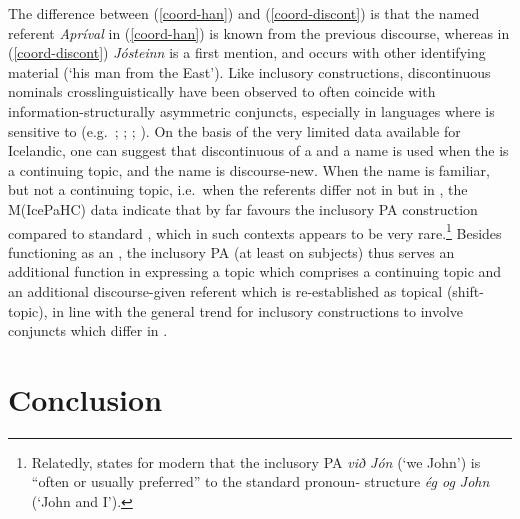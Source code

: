 \documentclass[output=paper,colorlinks,citecolor=brown]{langscibook}
\begin{document}
The difference between (\ref{coord-han}) and (\ref{coord-discont}) is that the named referent \textit{Apríval} in (\ref{coord-han}) is known from the previous discourse, whereas in (\ref{coord-discont}) \textit{Jósteinn} is a first mention, and occurs with other identifying material (`his man from the East'). Like inclusory constructions, discontinuous nominals crosslinguistically have been observed to often coincide with information-structurally asymmetric conjuncts, especially in languages where  is sensitive to  (e.g.~\citealp{mcgregor1997functions}; \citealp{deKuthy2002discontinuous}; \citealp{fanselow2006prosodic}; \citealp{skopeteas2020discontinuous}). On the basis of the very limited data available for Icelandic, one can suggest that discontinuous  of a  and a name is used when the  is a continuing topic, and the name is discourse-new. When the name is familiar, but not a continuing topic, i.e.~when the referents differ not in  but in , the M(IcePaHC) data indicate that  by far favours the inclusory PA construction compared to standard , which in such contexts appears to be very rare.\footnote{Relatedly, \citet[230]{Sigurdsson2006} states for modern  that the inclusory PA \textit{við Jón} (`we John') is ``often or usually preferred'' to the standard pronoun-  structure \textit{ég og John} (`John and I'). }
Besides functioning as an , the inclusory PA (at least on subjects) thus serves an additional function in expressing a topic which comprises a continuing topic and an additional discourse-given referent which is re-established as topical (shift-topic), in line with the general trend for inclusory constructions to involve conjuncts which differ in   \citep{bril2011noun}.

\section{Conclusion}\label{sect:conc}
\end{document}
